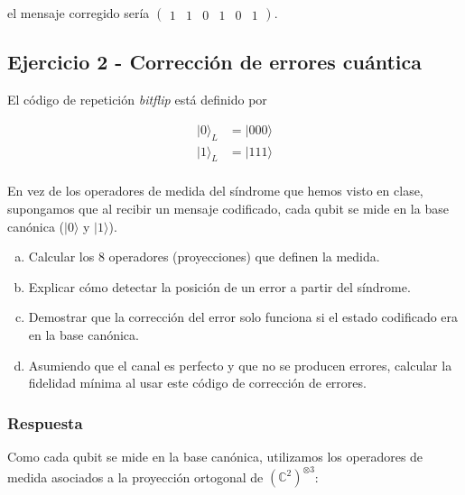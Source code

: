 \documentclass{article}
\begin{document}
el mensaje corregido sería $\begin{pmatrix}
1 & 1 & 0 & 1 & 0 & 1 \end{pmatrix}$.

\subsection*{Ejercicio 2 - Corrección de errores cuántica}

El código de repetición \textit{bitflip} está definido por 

\begin{align*}
  |0\rangle_L &= |000\rangle \\ 
  |1\rangle_L &= |111\rangle \\
\end{align*}

En vez de los operadores de medida del síndrome que hemos visto en
clase, supongamos que al recibir un mensaje codificado, cada qubit
se mide en la base canónica ($|0\rangle$ y $|1\rangle$).

\begin{enumerate}[a)]
  \item Calcular los 8 operadores (proyecciones) que definen la
    medida.
  \item Explicar cómo detectar la posición de un error a partir del
    síndrome.
  \item Demostrar que la corrección del error solo funciona si el
    estado codificado era en la base canónica.
  \item Asumiendo que el canal es perfecto y que no se producen
    errores, calcular la fidelidad mínima al usar este código de
    corrección de errores.
\end{enumerate}

\subsubsection*{Respuesta}

Como cada qubit se mide en la base canónica, utilizamos los
operadores de medida asociados a la proyección ortogonal de
$(\mathbb{C}^2)^{\otimes 3}$:
\end{document}
